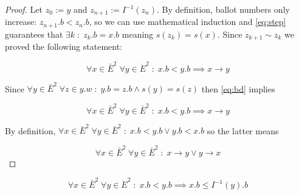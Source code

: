 \documentclass[a4paper,USenglish]{lipics-v2018}
\theoremstyle{definition}
\begin{document}
\begin{proof}
    Let $z_0 := y$ and $z_{n+1} := I^{-1}(z_{n})$. By definition, ballot numbers only increase: $z_{n+1}.b < z_{n}.b$, so we can use mathematical induction and \ref{eq:step} guarantees that $\exists k \;:\; z_k.b = x.b$ meaning $s(z_k) = s(x)$. Since $z_{k+1} \sim z_k$ we proved the following statement:

    \begin{equation} \label{eq:bd}
        \forall x \in \bar{E}^2 \; \forall y \in \ddot{E}^2 \;:\; x.b < y.b \implies x \to y
    \end{equation}
    
    Since $\forall y \in \bar{E}^2 \; \forall z \in y.w \;:\; y.b=z.b \land s(y)=s(z)$ then \ref{eq:bd} implies
    
    \begin{equation}
        \forall x \in \bar{E}^2 \; \forall y \in \bar{E}^2 \;:\; x.b < y.b \implies x \to y
    \end{equation}
    
    By definition, $\forall x \in \bar{E}^2 \; \forall y \in \bar{E}^2 \;:\; x.b < y.b \lor y.b < x.b$ so the latter means
    
    \begin{equation}
        \forall x \in \bar{E}^2 \; \forall y \in \bar{E}^2 \;:\; x \to y \lor y \to x
    \end{equation}
\end{proof}

\begin{theorem} \label{th:proof2}
    $$\forall x \in \bar{E}^2 \; \forall y \in \ddot{E}^2 \;:\; x.b < y.b \implies x.b \leq I^{-1}(y).b$$
\end{theorem}
\end{document}
